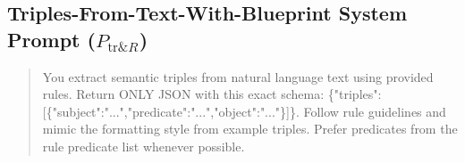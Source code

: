 \subsection*{Triples-From-Text-With-Blueprint System Prompt ($P_{\mathrm{tr}\&R}$)}
\begin{quote}
You extract semantic triples from natural language text using provided rules. Return ONLY JSON with this exact schema: \{"triples":[\{"subject":"...","predicate":"...","object":"..."\}]\}. Follow rule guidelines and mimic the formatting style from example triples. Prefer predicates from the rule predicate list whenever possible.
\end{quote}
